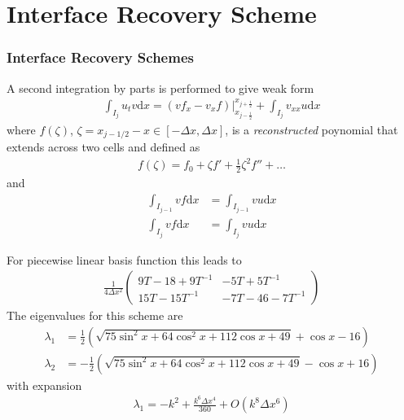 \documentclass[serif,12pt]{beamer}
\begin{document}
\section{Interface Recovery Scheme}
\begin{frame}
  \frametitle{Interface Recovery Schemes}
  A second integration by parts is performed to give weak form
  \begin{align*}
    \int_{I_j} u_t v \mathrm{d}x 
    =
    \left(vf_x - v_xf\right) \bigr|_{x_{j-\frac{1}{2}}}^{x_{j+\frac{1}{2}}}
    +
    \int_{I_j}v_{xx}u\mathrm{d}x
  \end{align*}
  where $f(\zeta)$, $\zeta=x_{j-1/2}-x \in [-\Delta x,\Delta x]$, is a
  \emph{reconstructed} poynomial that extends across two cells
  and defined as
  \begin{align*}
    f(\zeta) = f_0 + \zeta f' + \frac{1}{2}\zeta^2 f'' + \ldots
  \end{align*}
  and
  \begin{align*}
    \int_{I_{j-1}} v f \mathrm{d}x &= \int_{I_{j-1}} v u \mathrm{d}x \\
    \int_{I_{j}} v f \mathrm{d}x &= \int_{I_{j}} v u \mathrm{d}x
  \end{align*}
\end{frame}

\begin{frame}
  For piecewise linear basis function this leads to
  \begin{align*}
    \frac{1}{4\Delta x^2}
    \left(
    \begin{array}{cc}
      9T-18+9T^{-1} & -5T + 5T^{-1} \\
      15 T -15 T^{-1} & -7 T - 46 - 7T^{-1}
    \end{array}
    \right)
  \end{align*}
  The eigenvalues for this scheme are
  \begin{align*}
    \lambda_1 &= \frac{1}{2}\left(\sqrt{75\sin^2 x+64\cos^2 x+112\cos x+49}+\cos x-16\right) \\
    \lambda_2 &= -\frac{1}{2}\left(\sqrt{75\sin^2 x+64\cos^2 x+112\cos x+49}-\cos x+16\right)
  \end{align*}
  with expansion
  \begin{align*}
    \lambda_1 = -k^2 + \frac{k^6 \Delta x^4}{360} + O(k^8\Delta x^6)
  \end{align*}  
\end{frame}
\end{document}
